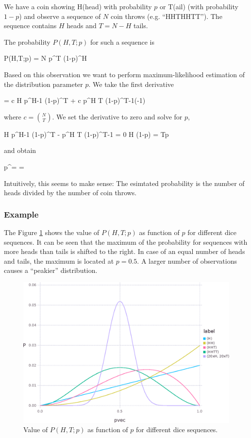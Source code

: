 
We have a coin showing H(head) with probability $p$ or T(ail) (with probability $1-p$) and observe a sequence of $N$ coin throws (e.g. ``HHTHHTT''). The sequence contains $H$ heads and $T = N-H$ tails.

The probability $P(H,T;p)$ for such a sequence is

\bee
P(H,T;p) = {N } p^T (1-p)^H
\eee

Based on this observation we want to perform maximum-likelihood estimation of the distribution parameter $p$. We take the first derivative

\bee
{} = c H p^{H-1} (1-p)^T + c p^H T (1-p)^{T-1}(-1)
\eee

where $c = {N \choose{T}}$. We set the derivative to zero and solve for $p$,

\bee
H p^{H-1} (1-p)^T - p^H T (1-p)^{T-1} = 0 \rightarrow H (1-p) = Tp
\eee

and obtain

\bee
p^\star =  = 
\eee

Intuitively, this seems to make sense: The esimtated probability is the number of heads divided by the number of coin throws.


\subsubsection{Example}

The Figure \ref{2017-02-20:fig1} shows the value of $P(H,T;p)$ as function of $p$ for different dice sequences. It can be seen that the maximum of the probability for sequences with more heads than tails is shifted to the right. In case of an equal number of heads and tails, the maximum is located at $p=0.5$. A larger number of observations causes a ``peakier'' distribution.

\begin{figure}[htb!]
\label{2017-02-20:fig1}
\centering
\includegraphics[scale=0.8]{images/bernoulli_est.eps}
\caption{Value of $P(H,T;p)$ as function of $p$ for different dice sequences.}
\end{figure}

